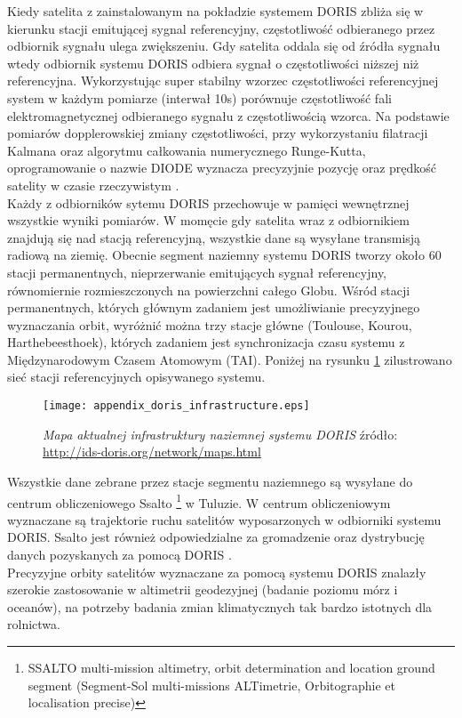 \indent Kiedy satelita z zainstalowanym na pokładzie systemem DORIS zbliża się w kierunku stacji emitującej sygnal referencyjny,
częstotliwość odbieranego przez odbiornik sygnału ulega zwiększeniu. Gdy satelita oddala się od źródła sygnału wtedy odbiornik systemu DORIS 
odbiera sygnał o częstotliwości niższej niż referencyjna. Wykorzystując super stabilny wzorzec częstotliwości referencyjnej system w każdym pomiarze (interwał 10s)
porównuje częstotliwość fali elektromagnetycznej odbieranego sygnału z częstotliwością wzorca. Na podstawie pomiarów dopplerowskiej zmiany częstotliwości,
przy wykorzystaniu filatracji Kalmana oraz algorytmu całkowania numerycznego Runge-Kutta, oprogramowanie o nazwie DIODE wyznacza precyzyjnie 
pozycję oraz prędkość satelity w czasie rzeczywistym \cite[][zakładka: /DORIS system/Diode]{DORIS_AVISO}.\\
\indent Każdy z odbiorników sytemu DORIS przechowuje w pamięci wewnętrznej wszystkie wyniki pomiarów. W momęcie gdy satelita wraz z odbiornikiem 
znajdują się nad stacją referencyjną, wszystkie dane są wysyłane transmisją radiową na ziemię. Obecnie segment naziemny systemu DORIS tworzy około 
60 stacji permanentnych, nieprzerwanie emitujących sygnał referencyjny, równomiernie rozmieszczonych na powierzchni całego Globu.
Wśród stacji permanentnych, których głównym zadaniem jest umożliwianie precyzyjnego wyznaczania orbit, wyróżnić można trzy stacje główne
(Toulouse, Kourou, Harthebeesthoek),
których zadaniem jest synchronizacja czasu systemu z Międzynarodowym Czasem Atomowym (TAI). 
Poniżej na rysunku \ref{fig:doris_infrastructure} zilustrowano sieć stacji referencyjnych opisywanego systemu.
\begin{figure}[H]
\centering
\texttt{[image: appendix\_doris\_infrastructure.eps]}
\caption{\textit{Mapa aktualnej infrastruktury naziemnej systemu DORIS} źródło: \protect\url{http://ids-doris.org/network/maps.html}}
\label{fig:doris_infrastructure}
\end{figure}
\indent Wszystkie dane zebrane przez stacje segmentu naziemnego są wysyłane do centrum obliczeniowego Ssalto
\footnote{SSALTO multi-mission altimetry, orbit determination and location ground segment (Segment-Sol multi-missions ALTimetrie, Orbitographie et localisation precise)}
w Tuluzie. W centrum obliczeniowym wyznaczane są trajektorie ruchu satelitów wyposarzonych w odbiorniki systemu DORIS. Ssalto jest również odpowiedzialne
za gromadzenie oraz dystrybucję danych pozyskanych za pomocą DORIS
\cite[][zakładka: Control and processing centre]{DORIS_AVISO}.\\
\indent Precyzyjne orbity satelitów wyznaczane za pomocą systemu DORIS znalazły szerokie zastosowanie w altimetrii geodezyjnej (badanie poziomu mórz i oceanów),
na potrzeby badania zmian klimatycznych tak bardzo istotnych dla rolnictwa. 

